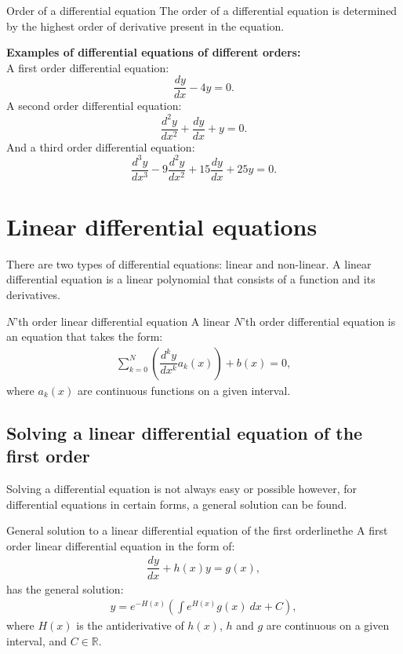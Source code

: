 \clearpage

\begin{definition}{Order of a differential equation}{}
The order of a differential equation is determined by the highest order of derivative present in the equation.
\end{definition} 

\noindent
\textbf{Examples of differential equations of different orders:}
\\
A first order differential equation:
$$\frac{dy}{dx}-4y=0. $$
A second order differential equation:
$$\frac{d^2y}{dx^2}+\frac{dy}{dx}+y = 0.$$
And a third order differential equation:
$$\frac{d^3y}{dx^3} - 9\frac{d^2y}{dx^2} + 15\frac{dy}{dx} + 25y = 0.$$

\section{Linear differential equations}
There are two types of differential equations: linear and non-linear. A linear differential equation is a linear polynomial that consists of a function and its derivatives.
\begin{definition}{$N$'th order linear differential equation}{}
A linear $N$'th order differential equation is an equation that takes the form:
\begin{align*}
\sum_{k=0}^{N}\left(\dfrac{d^ky}{dx^k}a_k(x)\right)+b(x)=0,
\end{align*}
where $a_k(x)$ are continuous functions on a given interval.
\end{definition}
\subsection{Solving a linear differential equation of the first order}
Solving  a differential equation is not always easy or possible however, for differential equations in certain forms, a general solution can be found.

\begin{theorem}{General solution to a linear differential equation of the first order}{linethe}
A first order linear differential equation in the form of:
\begin{align} \label{FODE_form}
\dfrac{dy}{dx}+h(x)y=g(x),
\end{align}
has the general solution:
\begin{align} \label{FODE_solution}
y=e^{-H(x)}\left(\int e^{H(x)}g(x)\ dx+C\right),
\end{align}
where $H(x)$ is the antiderivative of $h(x)$, $h$ and $g$ are continuous on a given interval, and $C\in \mathbb{R}$.
\end{theorem}

